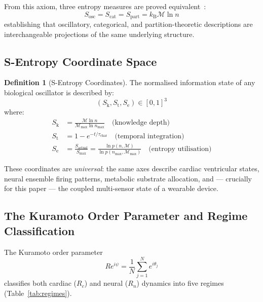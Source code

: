 \documentclass[10pt,twocolumn,a4paper]{article}
\theoremstyle{definition}
\newtheorem{definition}{Definition}
\newcommand{\SE}{S_{\text{e}}}
\newcommand{\SK}{S_{\text{k}}}
\newcommand{\ST}{S_{\text{t}}}
\newcommand{\Rc}{R_c}
\newcommand{\Rn}{R_n}
\newcommand{\kB}{k_{\text{B}}}
\begin{document}
From this axiom, three entropy measures are proved equivalent~\cite{sachikonye2024integration}:
\begin{equation}
S_{\text{osc}} = S_{\text{cat}} = S_{\text{part}} = \kB \mathcal{M} \ln n
\end{equation}
establishing that oscillatory, categorical, and partition-theoretic
descriptions are interchangeable projections of the same underlying
structure.

\subsection{S-Entropy Coordinate Space}

\begin{definition}[S-Entropy Coordinates]
\label{def:sentropy}
The normalised information state of any biological oscillator is
described by:
\begin{equation}
\label{eq:sentropy}
(\SK, \ST, \SE) \in [0,1]^3
\end{equation}
where:
\begin{align}
\SK &= \frac{\mathcal{M} \ln n}{\mathcal{M}_{\max} \ln n_{\max}}
    \quad \text{(knowledge depth)} \label{eq:sk}\\
\ST &= 1 - e^{-t/\tau_{\text{char}}}
    \quad \text{(temporal integration)} \label{eq:st}\\
\SE &= \frac{S_{\text{actual}}}{S_{\max}}
    = \frac{\ln p(n, \mathcal{M})}{\ln p(n_{\max}, \mathcal{M}_{\max})}
    \quad \text{(entropy utilisation)} \label{eq:se}
\end{align}
\end{definition}

These coordinates are \emph{universal}: the same axes describe cardiac
ventricular states, neural ensemble firing patterns, metabolic substrate
allocation, and --- crucially for this paper --- the coupled multi-sensor
state of a wearable device.

\subsection{The Kuramoto Order Parameter and Regime Classification}

The Kuramoto order parameter~\cite{kuramoto1984chemical,strogatz2000kuramoto}
\begin{equation}
R e^{i\psi} = \frac{1}{N}\sum_{j=1}^{N} e^{i\theta_j}
\end{equation}
classifies both cardiac ($\Rc$) and neural ($\Rn$) dynamics into five
regimes (Table~\ref{tab:regimes}).
\end{document}
